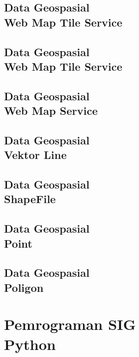 \documentclass{WileySix}
\begin{document}
\chapter[Open Geospatial Consortium]
{Data Geospasial\\ Web Map Tile Service}


\chapter[Web Map Tile Service]
{Data Geospasial\\ Web Map Tile Service}


\chapter[Web Map Service]
{Data Geospasial\\ Web Map Service}


\chapter[Data Vektor Line]
{Data Geospasial\\ Vektor Line}


\chapter[Shapefile]
{Data Geospasial\\ ShapeFile}



\chapter[Shapefile Point]
{Data Geospasial\\ Point}


\chapter[Shapefile Poligon]
{Data Geospasial\\ Poligon}



\part[Pemrograman SIG]
{Pemrograman SIG\\ Python}
\end{document}

